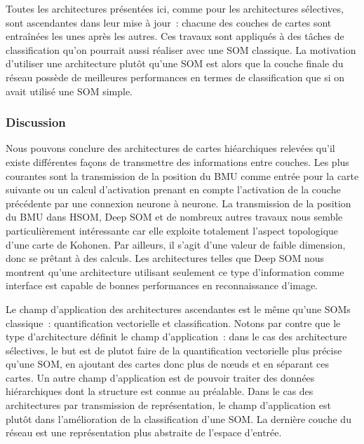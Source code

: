 \documentclass[../main]{subfiles}
\begin{document}
Toutes les architectures présentées ici, comme pour les architectures sélectives, sont ascendantes dans leur mise à jour~: chacune des couches de cartes sont entraînées les unes après les autres. 
Ces travaux sont appliqués à des tâches de classification qu'on pourrait aussi réaliser avec une SOM classique.
La motivation d'utiliser une architecture plutôt qu'une SOM est alors que la couche finale du réseau possède de meilleures performances en termes de classification que si on avait utilisé une SOM simple.

\subsubsection{Discussion}

Nous pouvons conclure des architectures de cartes hiéarchiques relevées qu'il existe différentes façons de transmettre des informations entre couches. Les plus courantes sont la transmission de la position du BMU comme entrée pour la carte suivante ou un calcul d'activation prenant en compte l'activation de la couche précédente par une connexion neurone à neurone.
La transmission de la position du BMU dans HSOM, Deep SOM et de nombreux autres travaux nous semble particulièrement intéressante car elle exploite totalement l'aspect topologique d'une carte de Kohonen. Par ailleurs, il s'agit d'une valeur de faible dimension, donc se prêtant à des calculs. Les architectures telles que Deep SOM nous montrent qu'une architecture utilisant seulement ce type d'information comme interface est capable de bonnes performances en reconnaissance d'image.

Le champ d'application des architectures ascendantes est le même qu'une SOMs classique~: quantification vectorielle et classification. Notons par contre que le type d'architecture définit le champ d'application~: 
dans le cas des architecture sélectives, le but est de plutot faire de la quantification vectorielle plus précise qu'une SOM, en ajoutant des cartes donc plus de n\oe{}uds et en séparant ces cartes. Un autre champ d'application est de pouvoir traiter des données hiérarchiques dont la structure est connue au préalable.
Dans le cas des architectures par transmission de représentation, le champ d'application est plutôt dans l'amélioration de la classification d'une SOM. La dernière couche du réseau est une représentation plus abstraite de l'espace d'entrée.
\end{document}
